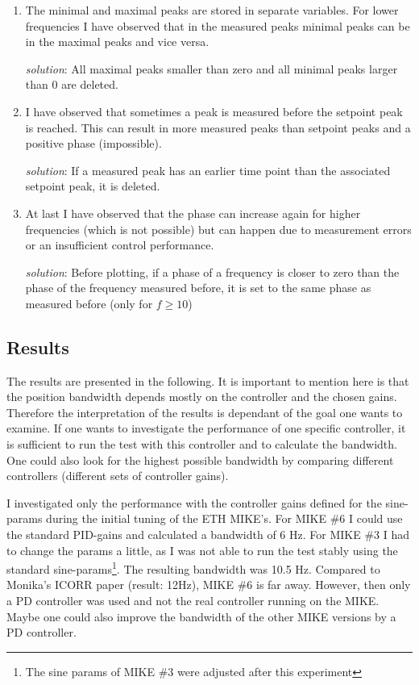 \begin{enumerate}
    \item The minimal and maximal peaks are stored in separate variables. For lower frequencies I have observed that in the measured peaks minimal peaks can be in the maximal peaks and vice versa.
    
    \emph{solution}: All maximal peaks smaller than zero and all minimal peaks larger than 0 are deleted.
    
    \item I have observed that sometimes a peak is measured before the setpoint peak is reached. This can result in more measured peaks than setpoint peaks and a positive phase (impossible).
    
    \emph{solution}: If a measured peak has an earlier time point than the associated setpoint peak, it is deleted.
    
    \item At last I have observed that the phase can increase again for higher frequencies (which is not possible) but can happen due to measurement errors or an insufficient control performance.
    
    \emph{solution}: Before plotting, if a phase of a frequency is closer to zero than the phase of the frequency measured before, it is set to the same phase as measured before (only for $f\geq10$)
\end{enumerate}

\subsection{Results}

The results are presented in the following. It is important to mention here is that the position bandwidth depends mostly on the controller and the chosen gains. Therefore the interpretation of the results is dependant of the goal one wants to examine. If one wants to investigate the performance of one specific controller, it is sufficient to run the test with this controller and to calculate the bandwidth. One could also look for the highest possible bandwidth by comparing different controllers (different sets of controller gains).

I investigated only the performance with the controller gains defined for the sine-params during the initial tuning of the ETH MIKE's. For MIKE \#6 I could use the standard PID-gains and calculated a bandwidth of 6 Hz. For MIKE \#3 I had to change the params a little, as I was not able to run the test stably using the standard sine-params\footnote{The sine params of MIKE \#3 were adjusted after this experiment}. The resulting bandwidth was 10.5 Hz. Compared to Monika's ICORR paper (result: 12Hz), MIKE \#6 is far away. However, then only a PD controller was used and not the real controller running on the MIKE. Maybe one could also improve the bandwidth of the other MIKE versions by a PD controller.

